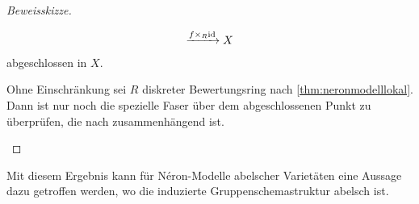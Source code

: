\begin{Satz}
\begin{proof}[Beweisskizze]
\begin{description}[font=\normalfont\itshape]
\begin{gather*}
        \xrightarrow{f\times_R\mathrm{id}} X
      \end{gather*}
      abgeschlossen in $X$.
    \item[$A$ hat zusammenhängende Fasern:]
      Ohne Einschränkung sei $R$ diskreter Bewertungsring nach
      \ref{thm:neronmodelllokal}.
      Dann ist nur noch die spezielle Faser über dem abgeschlossenen
      Punkt zu überprüfen, die nach \cite[{}5.5.1]{EGAIII-1} zusammenhängend
      ist.
    \end{description}
  \end{proof}
\end{Satz}

Mit diesem Ergebnis kann für Néron-Modelle abelscher Varietäten
eine Aussage dazu getroffen werden, wo die induzierte
Gruppenschemastruktur abelsch ist.
